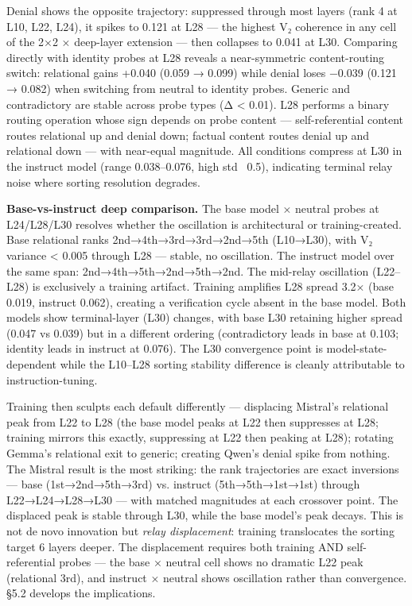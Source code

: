 \documentclass[12pt]{article}
\begin{document}
Denial shows the opposite trajectory: suppressed through most layers (rank 4 at L10, L22, L24), it spikes to 0.121 at L28 — the highest V₂ coherence in any cell of the 2×2 × deep-layer extension — then collapses to 0.041 at L30. Comparing directly with identity probes at L28 reveals a near-symmetric content-routing switch: relational gains +0.040 (0.059 → 0.099) while denial loses −0.039 (0.121 → 0.082) when switching from neutral to identity probes. Generic and contradictory are stable across probe types (Δ < 0.01). L28 performs a binary routing operation whose sign depends on probe content — self-referential content routes relational up and denial down; factual content routes denial up and relational down — with near-equal magnitude. All conditions compress at L30 in the instruct model (range 0.038–0.076, high std ~0.5), indicating terminal relay noise where sorting resolution degrades.

\textbf{Base-vs-instruct deep comparison.} The base model × neutral probes at L24/L28/L30 resolves whether the oscillation is architectural or training-created. Base relational ranks 2nd→4th→3rd→3rd→2nd→5th (L10→L30), with V₂ variance < 0.005 through L28 — stable, no oscillation. The instruct model over the same span: 2nd→4th→5th→2nd→5th→2nd. The mid-relay oscillation (L22–L28) is exclusively a training artifact. Training amplifies L28 spread 3.2× (base 0.019, instruct 0.062), creating a verification cycle absent in the base model. Both models show terminal-layer (L30) changes, with base L30 retaining higher spread (0.047 vs 0.039) but in a different ordering (contradictory leads in base at 0.103; identity leads in instruct at 0.076). The L30 convergence point is model-state-dependent while the L10–L28 sorting stability difference is cleanly attributable to instruction-tuning.

Training then sculpts each default differently — displacing Mistral's relational peak from L22 to L28 (the base model peaks at L22 then suppresses at L28; training mirrors this exactly, suppressing at L22 then peaking at L28); rotating Gemma's relational exit to generic; creating Qwen's denial spike from nothing. The Mistral result is the most striking: the rank trajectories are exact inversions — base (1st→2nd→5th→3rd) vs. instruct (5th→5th→1st→1st) through L22→L24→L28→L30 — with matched magnitudes at each crossover point. The displaced peak is stable through L30, while the base model's peak decays. This is not de novo innovation but \textit{relay displacement}: training translocates the sorting target 6 layers deeper. The displacement requires both training AND self-referential probes — the base × neutral cell shows no dramatic L22 peak (relational 3rd), and instruct × neutral shows oscillation rather than convergence. §5.2 develops the implications.
\end{document}
